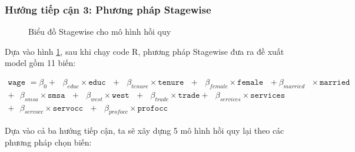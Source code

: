 \subsubsection*{Hướng tiếp cận 3: Phương pháp Stagewise}
\begin{figure}[H]
	\centering
	 \hfill
	\caption{Biểu đồ Stagewise cho mô hình hồi quy}
	\label{stagewise}
\end{figure}

Dựa vào hình \ref{stagewise}, sau khi chạy code R, phương pháp Stagewise đưa ra đề xuất model gồm 11 biến:

\begin{equation*}
	\begin{multlined}
		\texttt{wage } = \beta_0 + \text{ } \beta_{educ}\times \texttt{educ} \text{ } + \text{ } \beta_{tenure} \times \texttt{tenure} \text{ }+\text{ }\beta_{female} \times \texttt{female} \text{ } 
		+ \beta_{married} \text{ } \times \texttt{married} \text{ } \\
		+\text{ }\beta_{smsa} \times\texttt{smsa}\text{ }  
		+ \text{ }\beta_{west} \times \texttt{west} \text{ } 
		+ \text{ }\beta_{trade}\times \texttt{trade} + \text{ }\beta_{services} \times \texttt{services} \text{ } \\
		+ \text{ }\beta_{servocc} \times \texttt{servocc} \text{ } + \text{ }\beta_{profocc}\times \texttt{profocc}
	\end{multlined}
\end{equation*}

Dựa vào cả ba hướng tiếp cận, ta sẽ xây dựng 5 mô hình hồi quy lại theo các phương pháp chọn biến:

